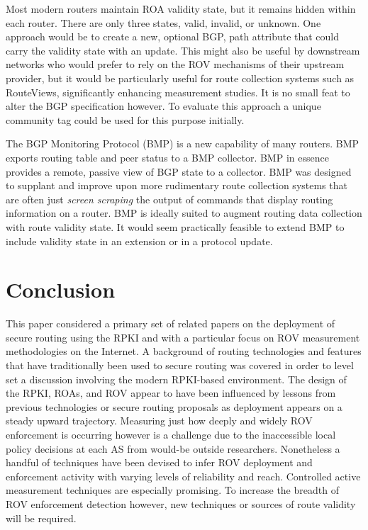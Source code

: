 \documentclass[sigconf]{acmart}
\begin{document}
Most modern routers maintain ROA validity state, but it remains hidden
within each router.  There are only three states, valid, invalid, or
unknown.  One approach would be to create a new, optional BGP, path
attribute that could carry the validity state with an update.  This
might also be useful by downstream networks who would prefer to rely on
the ROV mechanisms of their upstream provider, but it would be
particularly useful for route collection systems such as RouteViews,
significantly enhancing measurement studies.  It is no small feat to
alter the BGP specification however.  To evaluate this approach
a unique community tag could be used for this purpose initially.

The BGP Monitoring Protocol (BMP) is a new capability of many
routers.\cite{scudder_bgp_2016} BMP exports routing table and peer
status to a BMP collector.  BMP in essence provides a remote, passive
view of BGP state to a collector.  BMP was designed to supplant and
improve upon more rudimentary route collection systems that are often
just \emph{screen scraping} the output of commands that display routing
information on a router.  BMP is ideally suited to augment routing data
collection with route validity state.  It would seem practically
feasible to extend BMP to include validity state in an extension or in a
protocol update.

\section{Conclusion}\label{sec:Conclusion}

This paper considered a primary set of related papers on the deployment
of secure routing using the RPKI and with a particular focus on ROV
measurement methodologies on the Internet.  A background of routing
technologies and features that have traditionally been used to secure
routing was covered in order to level set a discussion involving the
modern RPKI-based environment.  The design of the RPKI, ROAs, and ROV
appear to have been influenced by lessons from previous technologies or
secure routing proposals as deployment appears on a steady upward
trajectory.  Measuring just how deeply and widely ROV enforcement is
occurring however is a challenge due to the inaccessible local policy
decisions at each AS from would-be outside researchers.  Nonetheless a
handful of techniques have been devised to infer ROV deployment and
enforcement activity with varying levels of reliability and reach.
Controlled active measurement techniques are especially promising.  To
increase the breadth of ROV enforcement detection however, new
techniques or sources of route validity will be required.
\end{document}
